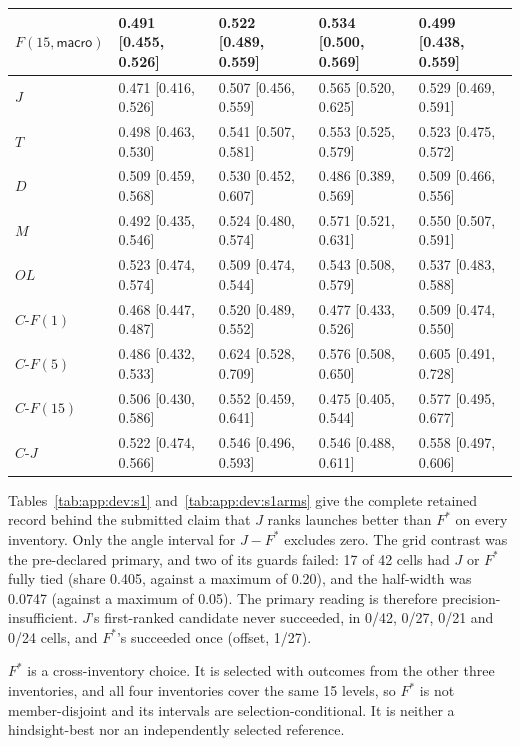 \begin{table}[t]
\begin{revblock}
\begin{tabular}{@{}lllll@{}}
$F(15,\textsf{macro})$ & 0.491 [0.455, 0.526] & 0.522 [0.489, 0.559] & 0.534 [0.500, 0.569] & 0.499 [0.438, 0.559] \\
\midrule
$J$  & 0.471 [0.416, 0.526] & 0.507 [0.456, 0.559] & 0.565 [0.520, 0.625] & 0.529 [0.469, 0.591] \\
$T$  & 0.498 [0.463, 0.530] & 0.541 [0.507, 0.581] & 0.553 [0.525, 0.579] & 0.523 [0.475, 0.572] \\
$D$  & 0.509 [0.459, 0.568] & 0.530 [0.452, 0.607] & 0.486 [0.389, 0.569] & 0.509 [0.466, 0.556] \\
$M$  & 0.492 [0.435, 0.546] & 0.524 [0.480, 0.574] & 0.571 [0.521, 0.631] & 0.550 [0.507, 0.591] \\
$OL$ & 0.523 [0.474, 0.574] & 0.509 [0.474, 0.544] & 0.543 [0.508, 0.579] & 0.537 [0.483, 0.588] \\
\midrule
$C\text{-}F(1)$  & 0.468 [0.447, 0.487] & 0.520 [0.489, 0.552] & 0.477 [0.433, 0.526] & 0.509 [0.474, 0.550] \\
$C\text{-}F(5)$  & 0.486 [0.432, 0.533] & 0.624 [0.528, 0.709] & 0.576 [0.508, 0.650] & 0.605 [0.491, 0.728] \\
$C\text{-}F(15)$ & 0.506 [0.430, 0.586] & 0.552 [0.459, 0.641] & 0.475 [0.405, 0.544] & 0.577 [0.495, 0.677] \\
$C\text{-}J$     & 0.522 [0.474, 0.566] & 0.546 [0.496, 0.593] & 0.546 [0.488, 0.611] & 0.558 [0.497, 0.606] \\
\bottomrule
\end{tabular}
\end{revblock}
\end{table}

\begin{revblock}
Tables~\ref{tab:app:dev:s1} and~\ref{tab:app:dev:s1arms} give the complete retained record behind the submitted claim that $J$ ranks launches better than $F^{*}$ on every inventory. Only the angle interval for $J-F^{*}$ excludes zero. The grid contrast was the pre-declared primary, and two of its guards failed: 17 of 42 cells had $J$ or $F^{*}$ fully tied (share 0.405, against a maximum of 0.20), and the half-width was 0.0747 (against a maximum of 0.05). The primary reading is therefore precision-insufficient. $J$'s first-ranked candidate never succeeded, in 0/42, 0/27, 0/21 and 0/24 cells, and $F^{*}$'s succeeded once (offset, 1/27).

$F^{*}$ is a cross-inventory choice. It is selected with outcomes from the other three inventories, and all four inventories cover the same 15 levels, so $F^{*}$ is not member-disjoint and its intervals are selection-conditional. It is neither a hindsight-best nor an independently selected reference.
\end{revblock}

